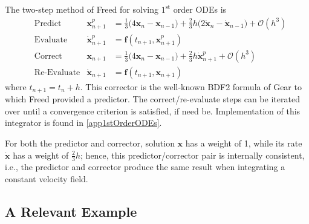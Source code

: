 The two-step method of Freed \cite{Freed17a} for solving $1^{\text{st}}$ order ODEs is
\begin{subequations}
    \label{1stOrderODEs}
    \begin{align}
    \mbox{} & \text{Predict} & 
    \mathbf{x}_{n+1}^p & = \tfrac{1}{3} 
    \bigl( 4 \mathbf{x}_n - \mathbf{x}_{n-1} \bigr) + 
    \tfrac{2}{3} h \bigl( 2 \dot{\mathbf{x}}_n - \dot{\mathbf{x}}_{n-1} 
    \bigr) + \mathcal{O} (h^3)
    \label{1stOrderPredictor} \\
    \mbox{} & \text{Evaluate} & 
    \dot{\mathbf{x}}^p_{n+1} & = \mathbf{f} (t_{n+1} , \mathbf{x}_{n+1}^p) 
    \label{1stOrderEvaluate} \\
    \mbox{} & \text{Correct} &
    \mathbf{x}_{n+1} & = \tfrac{1}{3} 
    \bigl( 4 \mathbf{x}_n - \mathbf{x}_{n-1} \bigr) + 
    \tfrac{2}{3} h \dot{\mathbf{x}}^{p}_{n+1} + \mathcal{O} (h^3)
    \label{1stOrderCorrector} \\
    \mbox{} & \text{Re-Evaluate} & 
    \dot{\mathbf{x}}_{n+1} & = \mathbf{f} (t_{n+1} , \mathbf{x}_{n+1}) 
    \label{1stOrderReEvaluate}
    \end{align}
\end{subequations} 
where $t_{n+1} = t_n + h$.  This corrector is the well-known BDF2 formula of Gear to which Freed provided a predictor.  The correct\slash re-evaluate steps can be iterated over until a convergence criterion is satisfied, if need be.  Implementation of this integrator is found in \ref{app1stOrderODEs}.  

For both the predictor and corrector, solution $\mathbf{x}$ has a weight of 1, while its rate $\dot{\mathbf{x}}$ has a weight of $\tfrac{2}{3} h$; hence, this predictor\slash corrector pair is internally consistent, i.e., the predictor and corrector produce the same result when integrating a constant velocity field.

\subsection{A Relevant Example}

